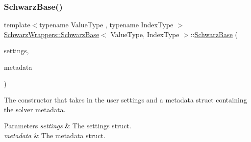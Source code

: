 \subsubsection{\texorpdfstring{Schwarz\+Base()}{SchwarzBase()}}
{\footnotesize\ttfamily template$<$typename Value\+Type , typename Index\+Type $>$ \\
\hyperlink{classSchwarzWrappers_1_1SchwarzBase}{Schwarz\+Wrappers\+::\+Schwarz\+Base}$<$ Value\+Type, Index\+Type $>$\+::\hyperlink{classSchwarzWrappers_1_1SchwarzBase}{Schwarz\+Base} (\begin{DoxyParamCaption}\item[{\hyperlink{structSchwarzWrappers_1_1Settings}{Settings} \&}]{settings,  }\item[{\hyperlink{structSchwarzWrappers_1_1Metadata}{Metadata}$<$ Value\+Type, Index\+Type $>$ \&}]{metadata }\end{DoxyParamCaption})}



The constructor that takes in the user settings and a metadata struct containing the solver metadata. 


\begin{DoxyParams}{Parameters}
{\em settings} & The settings struct. \\
\hline
{\em metadata} & The metadata struct. \\
\hline
\end{DoxyParams}


